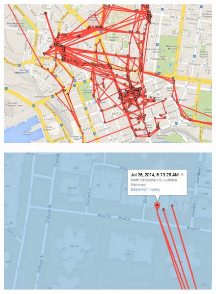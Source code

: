 \documentclass[11pt]{article}
\begin{document}
\begin{figure}[ht]
\centering
\includegraphics[width=5in]{images/google_maps_tracking.png}
\label{google_tracking}
\end{figure}

\begin{figure}[ht]
\centering
\includegraphics[width=5in]{images/google_maps_tracking_with_info.png}
\label{google_tracking}
\end{figure}
\end{document}
